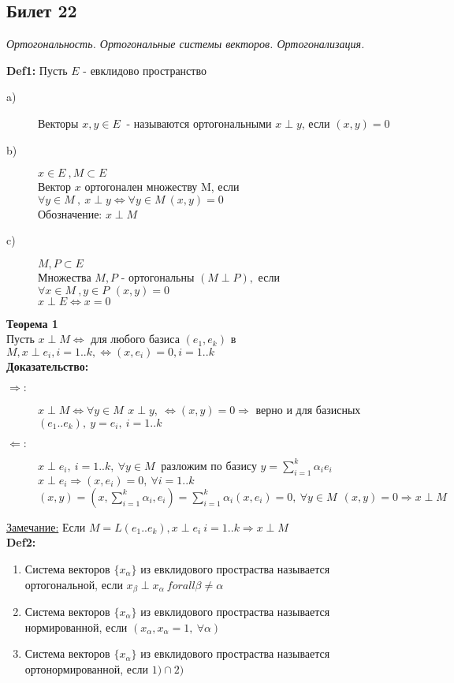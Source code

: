 \subsection{Билет 22}


\textit{Ортогональность. Ортогональные системы векторов. Ортогонализация.}


\textbf{Def1: } Пусть $E$ - евклидово пространство
\begin{description}
 \item [a)] Векторы $x,y \in E\ $ - называются ортогональными $x \perp y$, если $\left( x,y \right)=0$
 \item [b)] $x \in E\ , M \subset E$ \\
	Вектор $x$ ортогонален множеству M, если $\forall y \in M\ , \ x \perp y \Leftrightarrow \forall y \in M\ \left( x,y \right) = 0 $ \\
	Обозначение: $x \perp M$ 
 \item [c)] $M,P \subset E$ \\
	Множества $M,P$ - ортогональны $\left( M \perp P \right),$ если $\forall x \in M\ , y \in P\, \ \left( x,y \right)=0  $ \\
	$x \perp E \Leftrightarrow x=0 $
\end{description} 
\textbf{Теорема 1} \\
 Пусть $x \perp M \Leftrightarrow$ для любого базиса $(e_1,e_k)$ в $M,  x \perp e_i,  i=1..k,  \Leftrightarrow (x,e_i)=0, i=1..k $ \\
\textbf{Доказательство:} \\
\begin{description}
 \item [$\Rightarrow :$] $x \perp M \Leftrightarrow \forall y \in M\, \ x \perp y, \ \Leftrightarrow (x,y)=0 \Rightarrow$ верно и для базисных 
	$(e_1..e_k), \ y=e_i, \ i=1..k$
 \item [$\Leftarrow :$] $x \perp e_i, \ i=1..k, \ \forall y \in M\ $ разложим по базису $y = \sum \limits_{i=1}^k {\alpha_i e_i}$ \\
	$x \perp e_i \Rightarrow (x,e_i)=0, \ \forall i=1..k$ \\
	$(x,y)=(x,\sum \limits_{i=1}^k {\alpha_i,e_i}) = \sum \limits_{i=1}^k {\alpha_i (x,e_i) = 0, \ \forall y \in M\ \ (x,y)=0 \Rightarrow x \perp M } $
\end{description}
\underline{Замечание:} Если $M=L(e_1..e_k), x \perp e_i \ i=1..k \Rightarrow x \perp M $ \\
\textbf{Def2: } 
\begin{enumerate}
 \item Система векторов $\{x_{\alpha}\}$ из евклидового простраства называется ортогональной, если $x_{\beta} \perp x_{\alpha} \ forall \beta \ne \alpha$
 \item Система векторов $\{x_{\alpha}\}$ из евклидового простраства называется нормированной, если $(x_{\alpha},x_{\alpha}=1, \ \forall \alpha)$
 \item Система векторов $\{x_{\alpha}\}$ из евклидового простраства называется ортонормированной, если $1) \cap 2)$
\end{enumerate}
